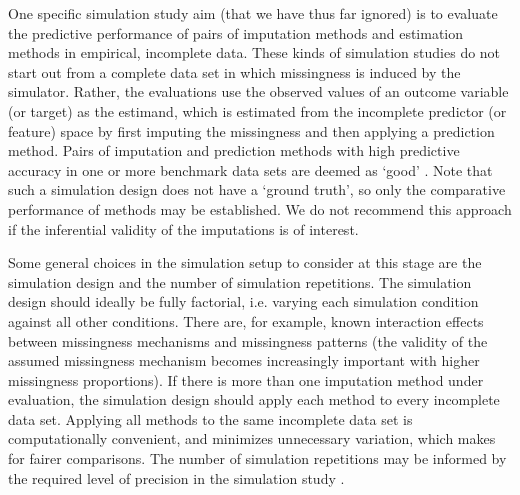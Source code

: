 \documentclass[bimj,fleqn]{w-art}
\begin{document}
One specific simulation study aim (that we have thus far ignored) is to evaluate the predictive performance of pairs of imputation methods and estimation methods in empirical, incomplete data. These kinds of simulation studies do not start out from a complete data set in which missingness is induced by the simulator. Rather, the evaluations use the observed values of an outcome variable (or target) as the estimand, which is estimated from the incomplete predictor (or feature) space by first imputing the missingness and then applying a prediction method. Pairs of imputation and prediction methods with high predictive accuracy in one or more benchmark data sets are deemed as `good' \citep{liu21}. Note that such a simulation design does not have a `ground truth', so only the comparative performance of methods may be established. We do not recommend this approach if the inferential validity of the imputations is of interest.


Some general choices in the simulation setup to consider at this stage are the simulation design and the number of simulation repetitions. The simulation design should ideally be fully factorial, i.e. varying each simulation condition against all other conditions. There are, for example, known interaction effects between missingness mechanisms and missingness patterns (the validity of the assumed missingness mechanism becomes increasingly important with higher missingness proportions). If there is more than one imputation method under evaluation, the simulation design should apply each method to every incomplete data set. Applying all methods to the same incomplete data set is computationally convenient, and minimizes unnecessary variation, which makes for fairer comparisons. The number of simulation repetitions may be informed by the required level of precision in the simulation study \citep[e.g. as determined from a maximum tolerable level of uncertainty in terms of a performance measure's Monte Carlo error][]{morr18}. 


\end{document}
